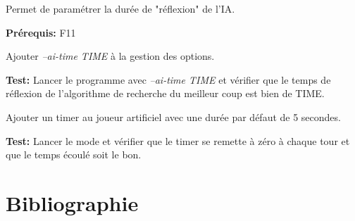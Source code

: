 \documentclass{article}
\begin{document}
\begin{needbox}
    Permet de paramétrer la durée de "réflexion" de l'IA.

    \textbf{Prérequis:} F11
    \begin{subneedbox}
        Ajouter \textit{--ai-time TIME} à la gestion des options.

        \textbf{Test:} Lancer le programme avec \textit{--ai-time TIME} et vérifier que
        le temps de réflexion de l'algorithme de recherche du meilleur coup est bien de TIME.
    \end{subneedbox}
    \begin{subneedbox}
        Ajouter un timer au joueur artificiel avec une durée par défaut de 5 secondes.

        \textbf{Test:} Lancer le mode et vérifier que le timer se remette à zéro à chaque tour et que le temps écoulé soit le bon.
    \end{subneedbox}
\end{needbox}




\section{Bibliographie}


\end{document}
